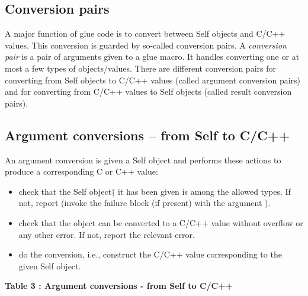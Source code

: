 \documentclass[letterpaper,10pt,english]{sphinxmanual}
\begin{document}

\subsection{Conversion pairs}
\label{vmref:index-80}\label{vmref:conversion-pairs}
A major function of glue code is to convert between Self objects and C/C++ values. This conversion
is guarded by so-called conversion pairs. A \emph{conversion pair} is a pair of arguments given to a
glue macro. It handles converting one or at most a few types of objects/values. There are different
conversion pairs for converting from Self objects to C/C++ values (called argument conversion
pairs) and for converting from C/C++ values to Self objects (called result conversion pairs).


\subsection{Argument conversions – from Self to C/C++}
\label{vmref:index-82}\label{vmref:argument-conversions-from-self-to-c-c}
An argument conversion is given a Self object and performs these actions to produce a corresponding
C or C++ value:
\begin{itemize}
\item {} 
check that the Self object† it has been given is among the allowed types. If not, report
 (invoke the failure block (if present) with the argument ).

\item {} 
check that the object can be converted to a C/C++ value without overflow or any other error.
If not, report the relevant error.

\item {} 
do the conversion, i.e., construct the C/C++ value corresponding to the given Self object.

\end{itemize}

\textbf{Table 3 : Argument conversions - from Self to C/C++}
\end{document}
